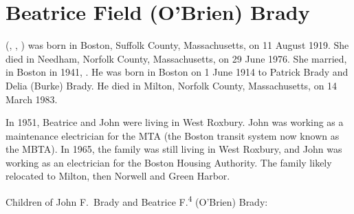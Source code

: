 \section{Beatrice Field (O'Brien) Brady}\label{per:Beatrice4OBrien}

 (, , ) was born in Boston, Suffolk County, Massachusetts, on 11 August 1919.\cite{Beatrice4OBrienBirth} She died in Needham, Norfolk County, Massachusetts, on 29 June 1976.\cite{Beatrice4OBrienDeath} She married, in Boston in 1941, .\cite{Beatrice4OBrienMarriage} He was born in Boston on 1 June 1914 to Patrick Brady and Delia (Burke) Brady.\cite{JohnBradyDraft,Census1920JohnBrady,PatrickBradyMarriage} He died in Milton, Norfolk County, Massachusetts, on 14 March 1983.\cite{JohnBradyDeath}

In 1951, Beatrice and John were living in West Roxbury. John was working as a maintenance electrician for the MTA (the Boston transit system now known as the MBTA).\cite{JohnBrady1951,HistoryoftheT} In 1965, the family was still living in West Roxbury, and John was working as an electrician for the Boston Housing Authority.\cite{JohnBrady1965} The family likely relocated to Milton, then Norwell and Green Harbor.\cite{Beatrice4OBrienObit}

\begin{KidsIntro}
	Children of John F.\ Brady and Beatrice F.\textsuperscript{4} (O'Brien) Brady:
\end{KidsIntro}

\begin{Kids}
	\KidNum{}{$\bullet$}
	
	\KidNum{}{$\bullet$}
	
	\KidNum{}{$\bullet$}
	
	\KidNum{}{$\bullet$}
\end{Kids}

